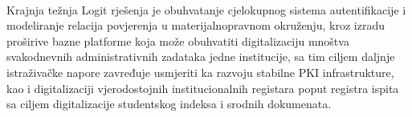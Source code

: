 \paragraph*{}
Krajnja težnja Logit rješenja je obuhvatanje cjelokupnog sistema autentifikacije i modeliranje relacija povjerenja u materijalnopravnom okruženju, kroz izradu proširive bazne platforme koja može obuhvatiti digitalizaciju mnoštva svakodnevnih administrativnih zadataka jedne institucije, sa tim ciljem daljnje istraživačke napore zavređuje usmjeriti ka razvoju stabilne PKI infrastrukture, kao i digitalizaciji vjerodostojnih institucionalnih registara poput registra ispita sa ciljem digitalizacije studentskog indeksa i srodnih dokumenata.